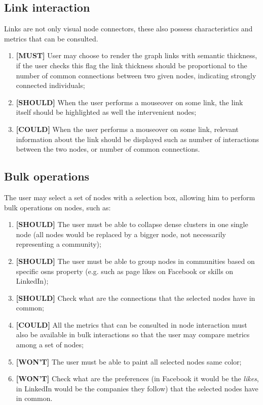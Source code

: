 \subsection{Link interaction}

Links are not only visual node connectors, these also possess characteristics and metrics that can be consulted.

\begin{enumerate}
    \item \textbf{[MUST]} User may choose to render the graph links with semantic thickness, if the user checks this flag the link thickness should be
    proportional to the number of common connections between two given nodes, indicating strongly connected individuals;
    \item \textbf{[SHOULD]} When the user performs a mouseover on some link, the link itself should be highlighted as well the intervenient nodes;
    \item \textbf{[COULD]} When the user performs a mouseover on some link, relevant information about the link should be displayed such as number of interactions between the two nodes, or number of common connections.
\end{enumerate}

\subsection{Bulk operations}

The user may select a set of nodes with a selection box, allowing him to perform bulk operations on nodes, such as:

\begin{enumerate}
    \item \textbf{[SHOULD]} The user must be able to collapse dense clusters in one single node (all nodes would be replaced by a bigger node, not necessarily representing a community); %
    \item \textbf{[SHOULD]} The user must be able to group nodes in communities based on specific \glspl{osn} property (e.g. such as page likes on Facebook or skills on LinkedIn);
    \item \textbf{[SHOULD]} Check what are the connections that the selected nodes have in common;
    \item \textbf{[COULD]} All the metrics that can be consulted in node interaction must also be available in bulk interactions so that the user may compare metrics among a set of nodes;
    \item \textbf{[WON'T]} The user must be able to paint all selected nodes same color;
    \item \textbf{[WON'T]} Check what are the preferences (in Facebook it would be the \textit{likes}, in LinkedIn would be the companies they follow) that the selected nodes have in common.
\end{enumerate}

